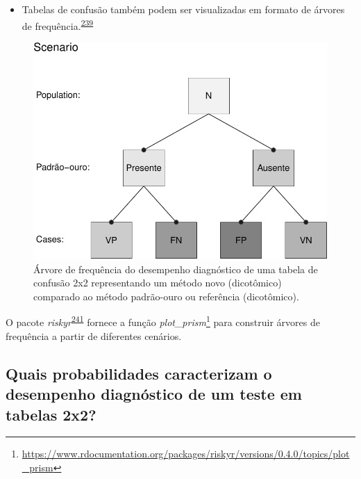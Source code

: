 \documentclass[
  a4paper,
]{book}
\providecommand{\tightlist}{%
  \setlength{\itemsep}{0pt}\setlength{\parskip}{0pt}}
\renewcommand{\href}[2]{#2\footnote{\url{#1}}}
\newenvironment{infobox}[1]
  {
  \begin{itemize}
  \renewcommand{\labelitemi}{
    \raisebox{-.7\height}[0pt][0pt]{
      {\setkeys{Gin}{width=3em,keepaspectratio}
        \texttt{[image: \#1]}}
    }
  }
  \setlength{\fboxsep}{1em}
  \begin{blackbox}
  \item
  }
  {
  \end{blackbox}
  \end{itemize}
  }
\begin{document}
\begin{itemize}
\tightlist
\item
  Tabelas de confusão também podem ser visualizadas em formato de árvores de frequência.\textsuperscript{\protect\hyperlink{ref-steckelberg2004}{239}}
\end{itemize}

\begin{figure}

{\centering \includegraphics{Ciencia-com-R_files/figure-latex/frequency-tree-1} 

}

\caption{Árvore de frequência do desempenho diagnóstico de uma tabela de confusão 2x2 representando um método novo (dicotômico) comparado ao método padrão-ouro ou referência (dicotômico).}\label{fig:frequency-tree}
\end{figure}

\begin{infobox}{images/Rlogo}
O pacote \emph{riskyr}\textsuperscript{\protect\hyperlink{ref-riskyr}{241}} fornece a função \href{https://www.rdocumentation.org/packages/riskyr/versions/0.4.0/topics/plot_prism}{\emph{plot\_prism}} para construir árvores de frequência a partir de diferentes cenários.

\end{infobox}

\hypertarget{quais-probabilidades-caracterizam-o-desempenho-diagnuxf3stico-de-um-teste-em-tabelas-2x2}{%
\subsection{Quais probabilidades caracterizam o desempenho diagnóstico de um teste em tabelas 2x2?}\label{quais-probabilidades-caracterizam-o-desempenho-diagnuxf3stico-de-um-teste-em-tabelas-2x2}}
\end{document}
